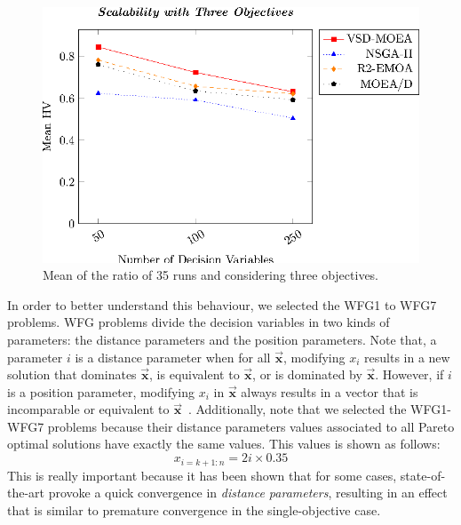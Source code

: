 \begin{figure}[t]
\centering
\includegraphics[]{Images/Graphic-Scalability-3obj_tikz-figure0.eps}
%
\caption{Mean of the ratio \HV{} of 35 runs and considering three objectives.} \label{fig:variable-decision-scalability-3obj}
\end{figure}

In order to better understand this behaviour, we selected the WFG1 to WFG7 problems.
%
WFG problems divide the decision variables in two kinds of parameters: the distance parameters and the position parameters.
%
Note that, a parameter $i$ is a distance parameter when for all $\vec{\mathbf{x}}$, modifying $x_i$ results in a new solution 
that dominates $\vec{\mathbf{x}}$, is equivalent to $\vec{\mathbf{x}}$, or is dominated by $\vec{\mathbf{x}}$.
%
However, if $i$ is a position parameter, modifying $x_i$ in $\vec{\mathbf{x}}$ always results in a vector that is incomparable or 
equivalent to $\vec{\mathbf{x}}$~\cite{huband2005scalable}.
%
Additionally, note that we selected the WFG1-WFG7 problems because their distance parameters values associated to all Pareto optimal solutions 
have exactly the same values.
%
This values is shown as follows:
\begin{equation}
   x_{i=k+1:n} = 2i \times 0.35
\end{equation}
%
This is really important because it has been shown that for some cases, state-of-the-art
\MOEAS{} provoke a quick convergence in \textit{distance parameters}, resulting in an effect that is similar to premature convergence
in the single-objective case.

